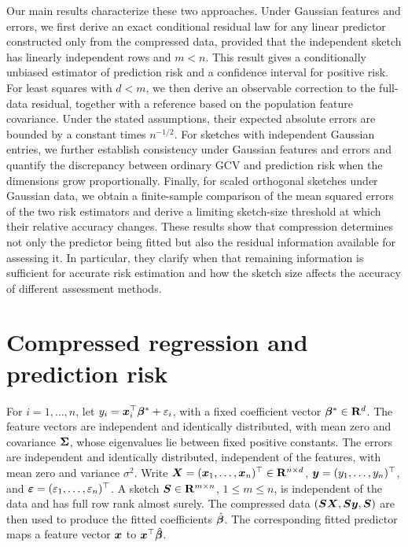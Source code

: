 \documentclass{article}
\theoremstyle{plain} %
\theoremstyle{definition} %
\theoremstyle{definition} %
\begin{document}
Our main results characterize these two approaches. Under Gaussian features and errors, we first derive an exact conditional residual law for any linear predictor constructed only from the compressed data, provided that the independent sketch has linearly independent rows and $m<n$. This result gives a conditionally unbiased estimator of prediction risk and a confidence interval for positive risk. For least squares with $d<m$, we then derive an observable correction to the full-data residual, together with a reference based on the population feature covariance. Under the stated assumptions, their expected absolute errors are bounded by a constant times $n^{-1/2}$.
For sketches with independent Gaussian entries, we further establish consistency under Gaussian features and errors and quantify the discrepancy between ordinary GCV and prediction risk when the dimensions grow proportionally. Finally, for scaled orthogonal sketches under Gaussian data, we obtain a finite-sample comparison of the mean squared errors of the two risk estimators and derive a limiting sketch-size threshold at which their relative accuracy changes.
These results show that compression determines not only the predictor being fitted but also the residual information available for assessing it. In particular, they clarify when that remaining information is sufficient for accurate risk estimation and how the sketch size affects the accuracy of different assessment methods.


\section{Compressed regression and prediction risk}
\label{sec:meth}

For $i=1,\ldots,n$, let
$y_i=\boldsymbol{x}_i^\top\boldsymbol{\beta}^*+\varepsilon_i$, with a fixed coefficient vector
$\boldsymbol{\beta}^*\in{\mathbf{R}}^d$. The feature vectors are independent and identically
distributed, with mean zero and covariance $\boldsymbol{\Sigma}$, whose eigenvalues
lie between fixed positive constants. The errors are independent and
identically distributed, independent of the features, with mean zero and
variance $\sigma^2$. Write
$\boldsymbol{X}=(\boldsymbol{x}_1,\ldots,\boldsymbol{x}_n)^\top\in{\mathbf{R}}^{n\times d}$,
$\boldsymbol{y}=(y_1,\ldots,y_n)^\top$, and
${\boldsymbol{\varepsilon} }=(\varepsilon_1,\ldots,\varepsilon_n)^\top$.
A sketch $\boldsymbol{S}\in{\mathbf{R}}^{m\times n}$, $1\leq m\leq n$, is independent of the
data and has full row rank almost surely. The compressed data
$(\boldsymbol{S}\boldsymbol{X},\boldsymbol{S}\boldsymbol{y},\boldsymbol{S})$ are then used to produce the fitted coefficients
$\hat{\boldsymbol{\beta}}{}$. The corresponding fitted predictor maps a feature vector
$\boldsymbol{x}$ to $\boldsymbol{x}^\top\hat{\boldsymbol{\beta}}{}$.
\end{document}
